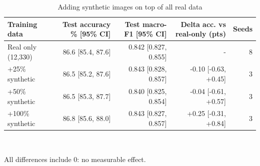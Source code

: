 \begin{table}[t]
\centering
\footnotesize
\caption{Adding synthetic images on top of all real data}
\label{tab:t08_augmentation}
\begin{tabular}{lrrrr}
\toprule
Training data & Test accuracy \% [95\% CI] & Test macro-F1 [95\% CI] & Delta acc. vs real-only (pts) & Seeds \\
\midrule
Real only (12,330) & 86.6 [85.4, 87.6] & 0.842 [0.827, 0.855] & - & 8 \\
+25\% synthetic & 86.5 [85.2, 87.6] & 0.843 [0.828, 0.857] & -0.10 [-0.63, +0.45] & 3 \\
+50\% synthetic & 86.5 [85.3, 87.7] & 0.840 [0.825, 0.854] & -0.04 [-0.61, +0.57] & 3 \\
+100\% synthetic & 86.8 [85.6, 88.0] & 0.843 [0.827, 0.857] & +0.25 [-0.31, +0.84] & 3 \\
\bottomrule
\end{tabular}
\\[2pt]\parbox{\linewidth}{\scriptsize All differences include 0: no measurable effect.}
\end{table}
